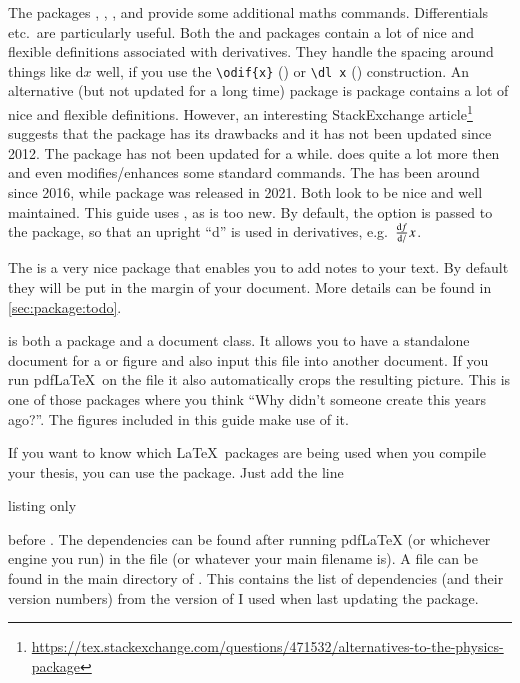The packages , , ,  and  provide some additional maths commands.
Differentials etc.\ are particularly useful.
Both the  and  packages contain a lot of nice and flexible definitions associated with derivatives.
They handle the spacing around things like \(\mathrm{d}x\) well,
if you use the \verb|\odif{x}| () or \verb|\dl x| () construction.
An alternative (but not updated for a long time) package is  package contains a lot of nice and flexible definitions.
However, an interesting StackExchange article\footnote{%
\url{https://tex.stackexchange.com/questions/471532/alternatives-to-the-physics-package}}
suggests that the package has its drawbacks and it has not been updated since 2012.
The  package has not been updated for a while.
 does quite a lot more then  and even modifies/enhances some standard commands.
The  has been around since 2016,
while  package was released in 2021.
Both look to be nice and well maintained.
This guide uses , as  is too new.
By default, the option  is passed to the  package,
so that an upright \enquote{d} is used in derivatives, e.g.\ \(\frac{\mathrm{d}f}{\mathrm{d}/}x\).

The  is a very nice package that enables you to add notes to your text.
By default they will be put in the margin of your document.
More details can be found in \cref{sec:package:todo}.

 is both a package and a document class.
It allows you to have a standalone document for a  or  figure
and also input this file into another document. If you run pdf\LaTeX\
on the file it also automatically crops the resulting picture. This is
one of those packages where you think \enquote{Why didn't someone
  create this years ago?}. The \Package{tikz} figures included in this
guide make use of it.

If you want to know which \LaTeX\ packages are being used when you compile your thesis,
you can use the \Package{snapshot} package.
Just add the line
\begin{tcblisting}{listing only}
\RequirePackage{snapshot}
\end{tcblisting}
\noindent before .
The dependencies can be found after running pdf\LaTeX{} (or whichever engine you run)
in the file  (or whatever your main filename is).
A file \File{mythesis.dep} can be found in the main directory of .
This contains the list of dependencies (and their version numbers) from the version of \TeXLive
I used when last updating the package.

